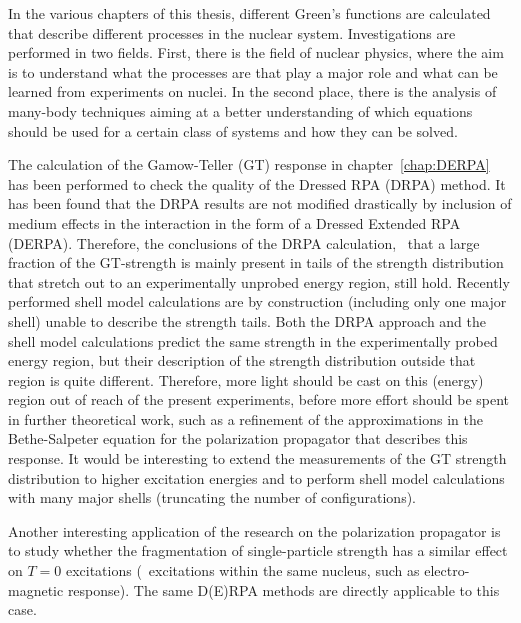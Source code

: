 In the various chapters of this thesis, different Green's functions are 
calculated that describe different processes in the nuclear system. 
Investigations are performed in two fields. First, there is the field of 
nuclear physics, where the aim is to understand what the processes are that 
play a major role and what can be learned from experiments on nuclei. 
In the second place, there is the analysis of 
many-body techniques aiming at  a better 
understanding of which equations should be used 
for a certain class of systems and how they can be solved.

The calculation of the Gamow-Teller (GT) response in chapter~\ref{chap:DERPA}
has been performed to check the quality of the Dressed RPA (DRPA) method.
It has been found that the DRPA results are not modified 
drastically by inclusion of medium effects in the interaction in the form of 
a Dressed Extended RPA (DERPA). Therefore, the conclusions of the DRPA 
calculation, \viz\ that a large fraction of 
the GT-strength is mainly present in tails of
the strength distribution that  stretch out to an experimentally unprobed 
energy region, still hold. 
Recently performed shell model calculations\cite{CZPM94,CPS95,LDR95} are by 
construction (including only one major shell) unable to describe the strength 
tails. 
Both the DRPA approach and the shell model calculations 
predict the same strength in the experimentally probed energy region, 
but their description of the strength distribution outside that
region is quite different. Therefore,
more light should be cast on this (energy) region out of reach of the present
experiments, before more effort should be spent in further theoretical work,
such as a refinement
of the approximations in the Bethe-Salpeter equation for the polarization 
propagator that describes this response. 
It would be interesting to extend the measurements of the
GT strength distribution to higher excitation energies and to  perform
shell model calculations with many major shells (truncating the
number of configurations). 

Another interesting application of the research on the polarization
propagator is to study whether 
the fragmentation of single-particle strength has
a similar effect on $T=0$ excitations 
(\ie\ excitations within the same nucleus, such as
electro-magnetic response). The same D(E)RPA methods are directly applicable
to this case.

